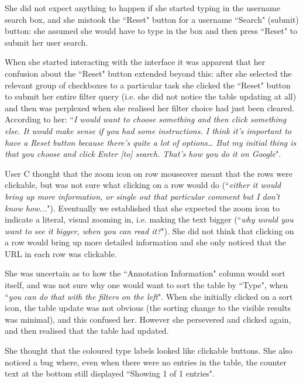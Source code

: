 She did not expect anything to happen if she started typing in the username search box, and she mistook the ``Reset" button for a username ``Search" (submit) button: she assumed she would have to type in the box and then press ``Reset" to submit her user search. 

When she started interacting with the interface it was apparent that her confusion about the ``Reset" button extended beyond this: after she selected the relevant group of checkboxes to a particular task she clicked the ``Reset" button to submit her entire filter query (i.e. she did not notice the table updating at all) and then was perplexed when she realised her filter choice had just been cleared. According to her: ``\textit{I would want to choose something and then click something else.  It would make sense if you had some instructions. I think it's important to have a Reset button because there's quite a lot of options… But my initial thing is that you choose and click Enter [to] search. That's how you do it on Google}". 

User C thought that the zoom icon on row mouseover meant that the rows were clickable, but was not sure what clicking on a row would do (``\textit{either it would bring up more information, or single out that particular comment but I don't know how...}"). Eventually we established that she expected the zoom icon to indicate a literal, visual zooming in, i.e. making the text bigger (``\textit{why would you want to see it bigger, when you can read it?}"). She did not think that clicking on a row would bring up more detailed information and she only noticed that the URL in each row was clickable. 

She was uncertain as to how the ``Annotation Information" column would sort itself, and was not sure why one would want to sort the table by ``Type", when ``\textit{you can do that with the filters on the left}". When she initially clicked on a sort icon, the table update was not obvious (the sorting change to the visible results was minimal), and this confused her. However she persevered and clicked again, and then realised that the table had updated. 

She thought that the coloured type labels looked like clickable buttons. She also noticed a bug where, even when there were no entries in the table, the counter text at the bottom still displayed ``Showing 1 of 1 entries".

